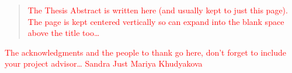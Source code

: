 \documentclass[
12pt, %
oneside, %
english, %
onehalfspacing, %
nolistspacing, %
parskip, %
headsepline, %
]{MastersDoctoralThesis} %
\begin{document}
\cleardoublepage






\begin{abstract}
\textcolor{red}{The Thesis Abstract is written here (and usually kept to just this page). The page is kept centered vertically so can expand into the blank space above the title too\ldots}
\end{abstract}


\begin{acknowledgements}
\addchaptertocentry{\acknowledgementname} %
\textcolor{red}{The acknowledgments and the people to thank go here, don't forget to include your project advisor\ldots}
\textcolor{red}{Sandra Just}
\textcolor{red}{Mariya Khudyakova}
\end{acknowledgements}


\tableofcontents %

\listoffigures %

\listoftables %

\end{document}
